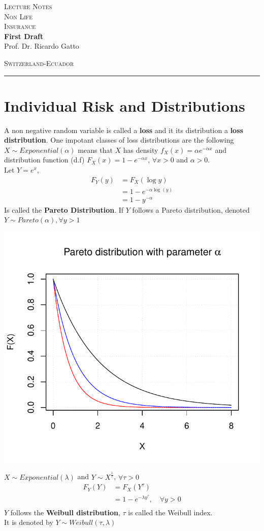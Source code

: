 \documentclass[11pt,a4paper,oneside]{article}\usepackage[]{graphicx}\usepackage[]{color}
\makeatletter
\def\maxwidth{ %
  \ifdim\Gin@nat@width>\linewidth
    \linewidth
  \else
    \Gin@nat@width
  \fi
}
\newenvironment{knitrout}{}{} %
\newcommand*{\titleBOOK}{\begingroup
\centering
\vspace*{\baselineskip}
\vspace*{\baselineskip}
{\Huge\scshape Lecture Notes}\\[10mm]
{\Huge\scshape Non Life  \\[5mm]
Insurance} \\ [\baselineskip]
{\Large\bfseries First Draft}\\[0.3 \textheight]
{\Large Prof. Dr. Ricardo Gatto}\\
\vfill
\begin{center}
{\scshape Switzerland-Ecuador}\\
\rule{\textwidth}{0.5pt}
\end{center}
\vspace*{\baselineskip}
\endgroup}
\makeatother
\begin{document}
\titleBOOK
\newpage

\tableofcontents
\newpage


\section{Individual Risk and Distributions}
A non negative random variable is called a \textbf{loss} and it its distribution a \textbf{loss distribution}. One impotant classes of loss distributions are the following\\

$X\sim Exponential(\alpha)$ means that $X$ has density $f_X(x)=\alpha e^{-\alpha x}$ and distribution function (d.f) $F_X(x)=1-e^{-\alpha x}$, $\forall x>0$ and $\alpha>0$.\\

Let $Y=e^x$, 
\begin{align*}
F_Y(y) &= F_X(\log y)\\
&=1-e^{-\alpha \log (y)}\\
&=1-y^{-\alpha}
\end{align*}
Is called the \textbf{Pareto Distribution}. If $Y$ follows a Pareto distribution, denoted  $Y\sim Pareto(\alpha),\forall y>1$

\begin{knitrout}
\color{fgcolor}

{\centering \includegraphics[width=\maxwidth]{figure/unnamed-chunk-1-1} 

}



\end{knitrout}
$X\sim Exponential (\lambda)$ and $Y\sim X^{\frac{1}{\tau}}$, $\forall \tau>0$
\begin{align*}
F_Y(Y) &= F_X(Y^{\tau})\\
&=1-e^{-\lambda y^{\tau}}, \quad \forall y>0\\
\end{align*}
$Y$ follows the \textbf{Weibull distribution}, $\tau$ is called the Weibull index.\\ It is denoted by $Y\sim Weibull(\tau,\lambda)$
\end{document}
